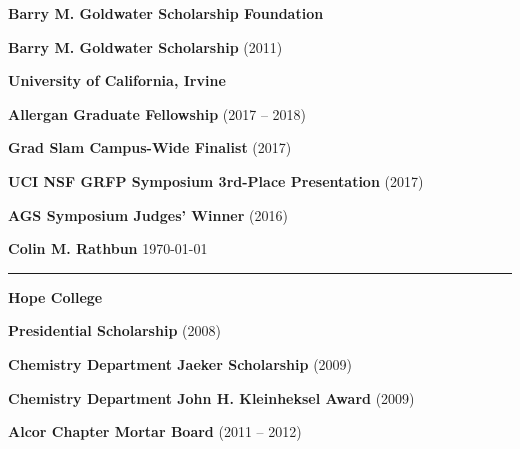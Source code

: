 \documentclass[10pt,letterpaper,courier]{article}
\newcommand{\makeheading}[1]%
        {\hspace*{-\marginparsep minus \marginparwidth}%
         \begin{minipage}[t]{\textwidth+\marginparwidth+\marginparsep}%
                {{\huge \bf \sf #1} \hfill \today}\\[-0.15\baselineskip]%
                 \rule{\columnwidth}{1pt}%
         \end{minipage}}
\newenvironment{innerlist}[1][\enskip\textbullet]%
        {\begin{compactenum}[#1]}{\end{compactenum}}
\newcommand{\blankline}{\quad\pagebreak[2]}
\begin{document}
\textbf{Barry M. Goldwater Scholarship Foundation}
\begin{innerlist}
\item {\bf Barry M. Goldwater Scholarship} (2011)
\end{innerlist}

\blankline

\textbf{University of California, Irvine}
\begin{innerlist}
\item {\bf Allergan Graduate Fellowship} (2017 -- 2018)
\item {\bf Grad Slam Campus-Wide Finalist} (2017)
\item {\bf UCI NSF GRFP Symposium 3rd-Place Presentation} (2017)
\item {\bf AGS Symposium Judges' Winner} (2016)
\end{innerlist}

\newpage\makeheading{Colin M. Rathbun} %

\vspace{.2in}

\textbf{Hope College}
\begin{innerlist}
\item {\bf Presidential Scholarship} (2008)
\item {\bf Chemistry Department Jaeker Scholarship} (2009)
\item {\bf Chemistry Department John H. Kleinheksel Award} (2009)
\item {\bf Alcor Chapter Mortar Board} (2011 -- 2012)
\end{innerlist}

\blankline %
\vspace{-.125in}


\blankline %
\end{document}
